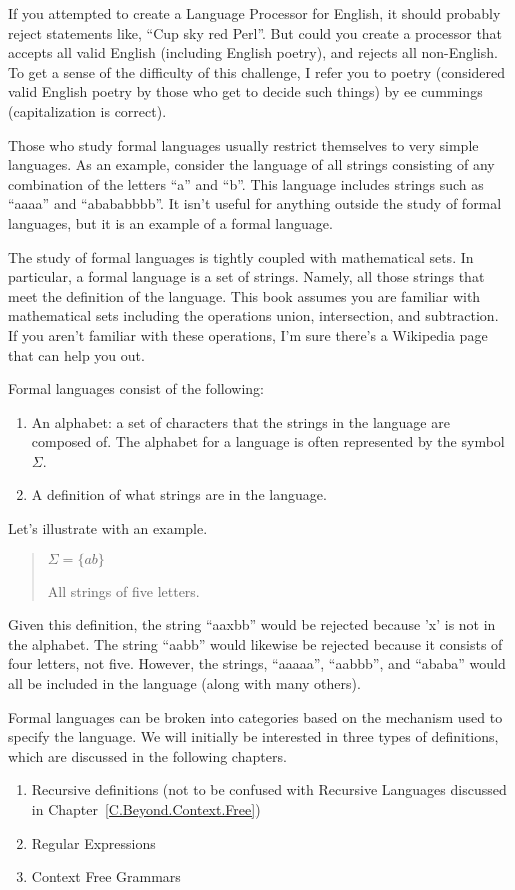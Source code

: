 \documentclass[letterpaper,12pt,openany,reqno]{book}%
\begin{document}
If you attempted to create a Language Processor for English, it should probably reject statements like, ``Cup sky red Perl''. But could you create a processor that accepts all valid English (including English poetry), and rejects all non-English. To get a sense of the difficulty of this challenge, I refer you to poetry (considered valid English poetry by those who get to decide such things) by ee cummings (capitalization is correct). 

Those who study formal languages usually restrict themselves to very simple languages. As an example, consider the language of all strings consisting of any combination of the letters ``a'' and ``b''. This language includes strings such as ``aaaa'' and ``abababbbb''. It isn't useful for anything outside the study of formal languages, but it is an example of a formal language.

The study of formal languages is tightly coupled with mathematical sets. In particular, a formal language is a set of strings. Namely, all those strings that meet the definition of the language.  This book assumes you are familiar with mathematical sets including the operations union, intersection, and subtraction. If you aren't familiar with these operations, I'm sure there's a Wikipedia page that can help you out.

Formal languages consist of the following:
\begin{enumerate}
\item An alphabet: a set of characters that the strings in the language are composed of. The alphabet for a language is often represented by the symbol $\Sigma$.
\item A definition of what strings are in the language.
\end{enumerate}

Let's illustrate with an example. 

\begin{quote}
$\Sigma = \{ a b \}$

All strings of five letters.
\end{quote}

Given this definition, the string ``aaxbb'' would be rejected because 'x' is not in the alphabet. The string ``aabb'' would likewise be rejected because it consists of four letters, not five. However, the strings, ``aaaaa'', ``aabbb'', and ``ababa'' would all be included in the language (along with many others).

Formal languages can be broken into categories based on the mechanism used to specify the language. We will initially be interested in three types of definitions, which are discussed in the following chapters.
\begin{enumerate}
\item Recursive definitions (not to be confused with Recursive Languages discussed in Chapter~\ref{C.Beyond.Context.Free})
\item Regular Expressions
\item Context Free Grammars
\end{enumerate}
\end{document}
